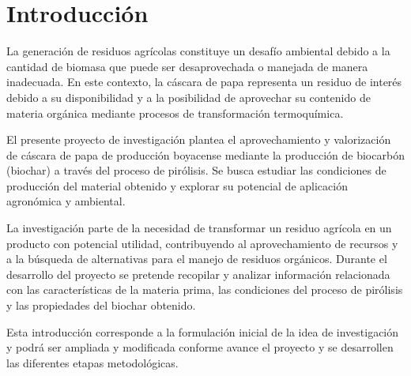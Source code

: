 \section{Introducción}

La generación de residuos agrícolas constituye un desafío ambiental debido a la cantidad de biomasa que puede ser desaprovechada o manejada de manera inadecuada. En este contexto, la cáscara de papa representa un residuo de interés debido a su disponibilidad y a la posibilidad de aprovechar su contenido de materia orgánica mediante procesos de transformación termoquímica.

El presente proyecto de investigación plantea el aprovechamiento y valorización de cáscara de papa de producción boyacense mediante la producción de biocarbón (biochar) a través del proceso de pirólisis. Se busca estudiar las condiciones de producción del material obtenido y explorar su potencial de aplicación agronómica y ambiental.

La investigación parte de la necesidad de transformar un residuo agrícola en un producto con potencial utilidad, contribuyendo al aprovechamiento de recursos y a la búsqueda de alternativas para el manejo de residuos orgánicos. Durante el desarrollo del proyecto se pretende recopilar y analizar información relacionada con las características de la materia prima, las condiciones del proceso de pirólisis y las propiedades del biochar obtenido.

Esta introducción corresponde a la formulación inicial de la idea de investigación y podrá ser ampliada y modificada conforme avance el proyecto y se desarrollen las diferentes etapas metodológicas.
